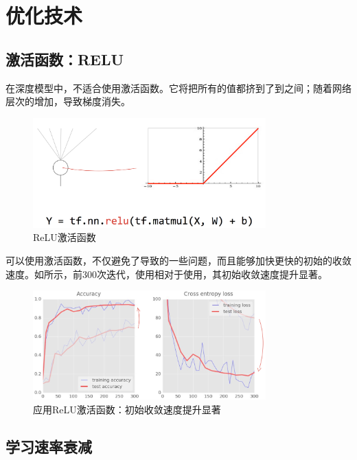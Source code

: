 \section{优化技术}

\begin{content}

\subsection{激活函数：RELU}

在深度模型中，不适合使用激活函数。它将把所有的值都挤到了到之间；随着网络层次的增加，导致梯度消失。

\begin{figure}[H]
\centering
\includegraphics[width=0.8\textwidth]{figures/mnist-relu.png}
\caption{ReLU激活函数}
 \label{fig:mnist-relu}
\end{figure}

可以使用激活函数，不仅避免了导致的一些问题，而且能够加快更快的初始的收敛速度。如所示，前300次迭代，使用相对于使用，其初始收敛速度提升显著。

\begin{figure}[H]
\centering
\includegraphics[width=0.8\textwidth]{figures/mnist-sigmoid-to-relu.png}
\caption{应用ReLU激活函数：初始收敛速度提升显著}
 \label{fig:mnist-sigmoid-to-relu}
\end{figure}

\subsection{学习速率衰减}


\end{content}
